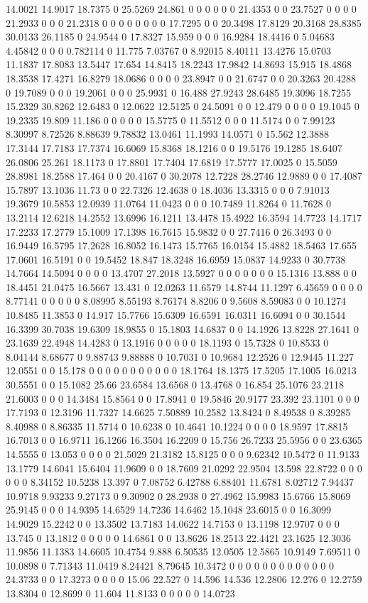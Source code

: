 14.0021 14.9017 18.7375 0 25.5269 24.861 0 0 0 0 0 0 21.4353 0 0 23.7527 0 0 0 0 21.2933 0 0 0 21.2318 0 0 0 0 0 0 0 0 17.7295 0 0 20.3498 17.8129 20.3168 28.8385 30.0133 26.1185 0 24.9544 0 17.8327 15.959 0 0 0 16.9284 18.4416 0 5.04683 4.45842 0 0 0 0.782114 0 11.775 7.03767 0 8.92015 8.40111 13.4276 15.0703 11.1837 17.8083 13.5447 17.654 14.8415 18.2243 17.9842 14.8693 15.915 18.4868 18.3538 17.4271 16.8279 18.0686 0 0 0 0 23.8947 0 0 21.6747 0 0 20.3263 20.4288 0 19.7089 0 0 0 19.2061 0 0 0 25.9931 0 16.488 27.9243 28.6485 19.3096 18.7255 15.2329 30.8262 12.6483 0 12.0622 12.5125 0 24.5091 0 0 12.479 0 0 0 0 19.1045 0 19.2335 19.809 11.186 0 0 0 0 0 15.5775 0 11.5512 0 0 0 11.5174 0 0 7.99123 8.30997 8.72526 8.88639 9.78832 13.0461 11.1993 14.0571 0 15.562 12.3888 17.3144 17.7183 17.7374 16.6069 15.8368 18.1216 0 0 19.5176 19.1285 18.6407 26.0806 25.261 18.1173 0 17.8801 17.7404 17.6819 17.5777 17.0025 0 15.5059 28.8981 18.2588 17.464 0 0 20.4167 0 30.2078 12.7228 28.2746 12.9889 0 0 17.4087 15.7897 13.1036 11.73 0 0 22.7326 12.4638 0 18.4036 13.3315 0 0 0 7.91013 19.3679 10.5853 12.0939 11.0764 11.0423 0 0 0 10.7489 11.8264 0 11.7628 0 13.2114 12.6218 14.2552 13.6996 16.1211 13.4478 15.4922 16.3594 14.7723 14.1717 17.2233 17.2779 15.1009 17.1398 16.7615 15.9832 0 0 27.7416 0 26.3493 0 0 16.9449 16.5795 17.2628 16.8052 16.1473 15.7765 16.0154 15.4882 18.5463 17.655 17.0601 16.5191 0 0 19.5452 18.847 18.3248 16.6959 15.0837 14.9233 0 30.7738 14.7664 14.5094 0 0 0 0 13.4707 27.2018 13.5927 0 0 0 0 0 0 0 15.1316 13.888 0 0 18.4451 21.0475 16.5667 13.431 0 12.0263 11.6579 14.8744 11.1297 6.45659 0 0 0 0 8.77141 0 0 0 0 0 8.08995 8.55193 8.76174 8.8206 0 9.5608 8.59083 0 0 10.1274 10.8485 11.3853 0 14.917 15.7766 15.6309 16.6591 16.0311 16.6094 0 0 30.1544 16.3399 30.7038 19.6309 18.9855 0 15.1803 14.6837 0 0 14.1926 13.8228 27.1641 0 23.1639 22.4948 14.4283 0 13.1916 0 0 0 0 0 18.1193 0 15.7328 0 10.8533 0 8.04144 8.68677 0 9.88743 9.88888 0 10.7031 0 10.9684 12.2526 0 12.9445 11.227 12.0551 0 0 15.178 0 0 0 0 0 0 0 0 0 0 0 18.1764 18.1375 17.5205 17.1005 16.0213 30.5551 0 0 15.1082 25.66 23.6584 13.6568 0 13.4768 0 16.854 25.1076 23.2118 21.6003 0 0 0 14.3484 15.8564 0 0 17.8941 0 19.5846 20.9177 23.392 23.1101 0 0 0 17.7193 0 12.3196 11.7327 14.6625 7.50889 10.2582 13.8424 0 8.49538 0 8.39285 8.40988 0 8.86335 11.5714 0 10.6238 0 10.4641 10.1224 0 0 0 0 18.9597 17.8815 16.7013 0 0 16.9711 16.1266 16.3504 16.2209 0 15.756 26.7233 25.5956 0 0 23.6365 14.5555 0 13.053 0 0 0 0 21.5029 21.3182 15.8125 0 0 0 9.62342 10.5472 0 11.9133 13.1779 14.6041 15.6404 11.9609 0 0 18.7609 21.0292 22.9504 13.598 22.8722 0 0 0 0 0 0 8.34152 10.5238 13.397 0 7.08752 6.42788 6.88401 11.6781 8.02712 7.94437 10.9718 9.93233 9.27173 0 9.30902 0 28.2938 0 27.4962 15.9983 15.6766 15.8069 25.9145 0 0 0 14.9395 14.6529 14.7236 14.6462 15.1048 23.6015 0 0 16.3099 14.9029 15.2242 0 0 13.3502 13.7183 14.0622 14.7153 0 13.1198 12.9707 0 0 0 13.745 0 13.1812 0 0 0 0 0 14.6861 0 0 13.8626 18.2513 22.4421 23.1625 12.3036 11.9856 11.1383 14.6605 10.4754 9.888 6.50535 12.0505 12.5865 10.9149 7.69511 0 10.0898 0 7.71343 11.0419 8.24421 8.79645 10.3472 0 0 0 0 0 0 0 0 0 0 0 0 0 24.3733 0 0 17.3273 0 0 0 0 15.06 22.527 0 14.596 14.536 12.2806 12.276 0 12.2759 13.8304 0 12.8699 0 11.604 11.8133 0 0 0 0 0 14.0723 